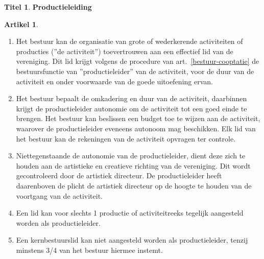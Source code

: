 \documentclass[a4paper,10pt]{article}
\theoremstyle{definition}
\newtheorem{titel}{\newline\Large Titel}
\newtheorem{artikelbase}{\large Artikel}
\newenvironment{artikel}
  {\begin{artikelbase}}
  {\smallskip
   \end{artikelbase}}
\newcommand{\ttext}[1]{\Large \textbf{#1} \normalsize}
\newcommand{\ttextenum}{\mbox{}}
\begin{document}
\begin{titel}\ttext{Productieleiding}

  \begin{artikel}\label{bestuur-productie}\ttextenum
    \begin{enumerate}
      \item
        Het bestuur kan de organisatie van grote of wederkerende activiteiten of producties (''de activiteit'') toevertrouwen aan een effectief lid van de vereniging.
        Dit lid krijgt volgens de procedure van art.~\ref{bestuur-cooptatie} de bestuursfunctie van ''productieleider'' van de activiteit, voor de duur van de activiteit en onder voorwaarde van de goede uitoefening ervan.
      \item
        Het bestuur bepaalt de omkadering en duur van de activiteit, daarbinnen krijgt de productieleider autonomie om de activiteit tot een goed einde te brengen.
        Het bestuur kan beslissen een budget toe te wijzen aan de activiteit, waarover de productieleider eveneens autonoom mag beschikken.
        Elk lid van het bestuur kan de rekeningen van de activiteit opvragen ter controle.
      \item
        Niettegenstaande de autonomie van de productieleider, dient deze zich te houden aan de artistieke en creatieve richting van de vereniging.
        Dit wordt gecontroleerd door de artistiek directeur.
        De productieleider heeft daarenboven de plicht de artistiek directeur op de hoogte te houden van de voortgang van de activiteit.
      \item
        Een lid kan voor slechts 1 productie of activiteitreeks tegelijk aangesteld worden als productieleider.
      \item
        Een kernbestuurslid kan niet aangesteld worden als productieleider, tenzij minstens 3/4 van het bestuur hiermee instemt.
    \end{enumerate}
  \end{artikel}


\end{titel}
\end{document}
